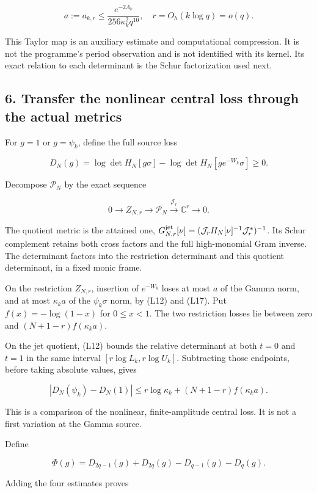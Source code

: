 \documentclass[11pt,a4paper]{article}
\begin{document}
\[
a:=a_{k,r}\le\frac{e^{-2\Lambda_k}}{256\kappa_k^2q^{10}},
\quad r=O_h(k\log q)=o(q).
\tag{L20}
\]

This Taylor map is an auxiliary estimate and computational compression. It is not the programme's period observation and is not identified with its kernel. Its exact relation to each determinant is the Schur factorization used next.

\subsection{6. Transfer the nonlinear central loss through the actual metrics}\label{loc:transfer-the-nonlinear-central-loss-through-the-actual-metrics}

For \(g=1\) or \(g=\psi_k\), define the full source loss

\[
D_N(g)=\log\det H_N[g\sigma]-\log\det H_N[ge^{-W_k}\sigma]\ge0.
\tag{L21}
\]

Decompose \(\mathcal P_N\) by the exact sequence

\[
0\longrightarrow Z_{N,r}\longrightarrow\mathcal P_N
\xrightarrow{\mathcal J_r}\mathbb C^r\longrightarrow0.
\]

The quotient metric is the attained one,
\(G_{N,r}^{\rm jet}[\nu]=(\mathcal J_rH_N[\nu]^{-1}\mathcal J_r^*)^{-1}\).
Its Schur complement retains both cross factors and the full high-monomial Gram inverse. The determinant factors into the restriction determinant and this quotient determinant, in a fixed monic frame.

On the restriction \(Z_{N,r}\), insertion of \(e^{-W_k}\) loses at most \(a\) of the Gamma norm, and at most \(\kappa_k a\) of the \(\psi_k\sigma\) norm, by (L12) and (L17). Put \(f(x)=-\log(1-x)\) for \(0\le x<1\). The two restriction losses lie between zero and \((N+1-r)f(\kappa_k a)\).

On the jet quotient, (L12) bounds the relative determinant at both \(t=0\) and \(t=1\) in the same interval \([r\log L_k,r\log U_k]\). Subtracting those endpoints, before taking absolute values, gives

\[
\boxed{|D_N(\psi_k)-D_N(1)|
\le r\log\kappa_k+(N+1-r)f(\kappa_k a).}
\tag{L22}
\]

This is a comparison of the nonlinear, finite-amplitude central loss. It is not a first variation at the Gamma source.

Define

\[
\Phi(g)=D_{2q-1}(g)+D_{2q}(g)-D_{q-1}(g)-D_q(g).
\]

Adding the four estimates proves
\end{document}
